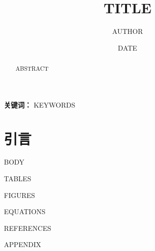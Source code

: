 \documentclass[UTF8,a4paper,zihao=-4]{ctexart}
\title{{{TITLE}}}
\author{{{AUTHOR}}}
\date{{{DATE}}}
\begin{document}
\maketitle

\begin{abstract}
{{ABSTRACT}}
\end{abstract}

\noindent\textbf{关键词：} {{KEYWORDS}}

\section{引言}
{{BODY}}

{{TABLES}}

{{FIGURES}}

{{EQUATIONS}}

{{REFERENCES}}

{{APPENDIX}}
\end{document}
